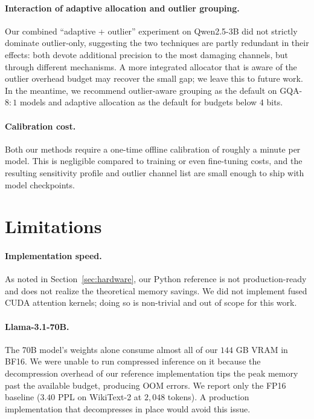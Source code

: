 \documentclass[11pt]{article}
\begin{document}
\paragraph{Interaction of adaptive allocation and outlier grouping.}
Our combined ``adaptive + outlier'' experiment on Qwen2.5-3B did not strictly dominate outlier-only, suggesting the two techniques are partly redundant in their effects: both devote additional precision to the most damaging channels, but through different mechanisms. A more integrated allocator that is aware of the outlier overhead budget may recover the small gap; we leave this to future work. In the meantime, we recommend outlier-aware grouping as the default on GQA-$8{:}1$ models and adaptive allocation as the default for budgets below $4$ bits.

\paragraph{Calibration cost.}
Both our methods require a one-time offline calibration of roughly a minute per model. This is negligible compared to training or even fine-tuning costs, and the resulting sensitivity profile and outlier channel list are small enough to ship with model checkpoints.

\section{Limitations}
\label{sec:limitations}

\paragraph{Implementation speed.}
As noted in Section~\ref{sec:hardware}, our Python reference is not production-ready and does not realize the theoretical memory savings. We did not implement fused CUDA attention kernels; doing so is non-trivial and out of scope for this work.

\paragraph{Llama-3.1-70B.}
The 70B model's weights alone consume almost all of our $144$ GB VRAM in BF16. We were unable to run compressed inference on it because the decompression overhead of our reference implementation tips the peak memory past the available budget, producing OOM errors. We report only the FP16 baseline ($3.40$ PPL on WikiText-2 at $2{,}048$ tokens). A production implementation that decompresses in place would avoid this issue.
\end{document}
